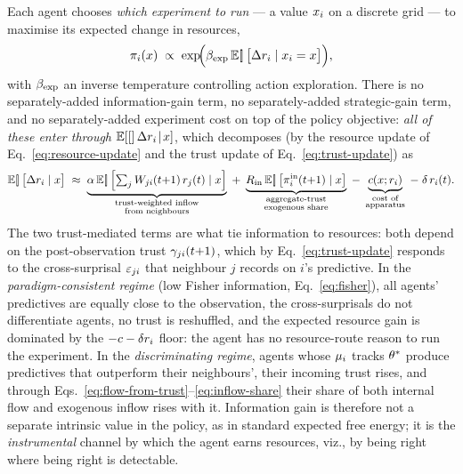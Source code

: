 Each agent chooses \emph{which experiment to run} --- a value
$x_i$ on a discrete grid --- to maximise its expected change in
resources,
\begin{equation}
\pi_i(x)
\;\propto\;
\exp\!\Bigl(\beta_{\mathrm{exp}}\,\mathbb{E}\!\left[\!\right]\bigl[\Delta r_{i} \mid x_i = x\bigr]\Bigr),
\label{eq:policy}
\end{equation}
with $\beta_{\mathrm{exp}}$ an inverse temperature controlling action exploration.
There is no separately-added information-gain term, no separately-added
strategic-gain term, and no separately-added experiment cost on top of
the policy objective: \emph{all of these enter through}
$\mathbb{E}\!\left[[\right]\Delta r_{i}\!\mid\!x]$, which decomposes (by the
resource update of Eq.~\ref{eq:resource-update} and the trust update
of Eq.~\ref{eq:trust-update}) as
\begin{equation}
\mathbb{E}\!\left[\!\right]\bigl[\Delta r_{i} \mid x\bigr]
\;\approx\;
\underbrace{\alpha\,\mathbb{E}\!\left[\!\right]\Bigl[\textstyle\sum_j W_{ji}(t{+}1)\,r_{j}(t) \mid x\Bigr]}_{\substack{\text{trust-weighted inflow}\\\text{from neighbours}}}
\;+\;
\underbrace{R_{\mathrm{in}}\,\mathbb{E}\!\left[\!\right]\bigl[\pi^{\mathrm{in}}_{i}(t{+}1) \mid x\bigr]}_{\substack{\text{aggregate-trust}\\\text{exogenous share}}}
\;-\;
\underbrace{c(x;r_{i})}_{\substack{\text{cost of}\\\text{apparatus}}}
\;-\;
\delta\,r_{i}(t).
\label{eq:expected-resource-gain}
\end{equation}
The two trust-mediated terms are what tie information to resources:
both depend on the post-observation trust
$\gamma_{ji}(t{+}1)$, which by Eq.~\eqref{eq:trust-update} responds
to the cross-surprisal $\varepsilon_{ji}$ that neighbour $j$ records on
$i$'s predictive. In the \emph{paradigm-consistent regime} (low Fisher
information, Eq.~\ref{eq:fisher}), all agents' predictives are equally
close to the observation, the cross-surprisals do not differentiate
agents, no trust is reshuffled, and the expected resource gain is
dominated by the $-c - \delta r_{i}$ floor: the agent
has no resource-route reason to run the experiment. In the
\emph{discriminating regime}, agents whose $\mu_i$ tracks
$\theta^{*}$ produce predictives that outperform their neighbours',
their incoming trust rises, and through
Eqs.~\eqref{eq:flow-from-trust}--\eqref{eq:inflow-share} their share
of both internal flow and exogenous inflow rises with it. Information
gain is therefore not a separate intrinsic value in the policy, as
in standard expected free energy; it is the \emph{instrumental}
channel by which the agent earns resources, viz., by being right where
being right is detectable.

